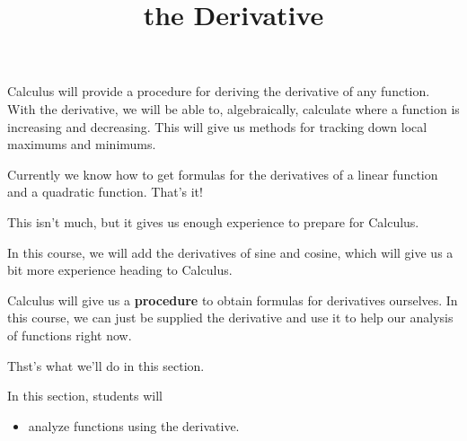 \documentclass{ximera}
\title{the Derivative}
\begin{document}
\begin{abstract}
%
\end{abstract}
\maketitle




Calculus will provide a procedure for deriving the derivative of any function.  With the derivative, we will be able to, algebraically, calculate where a function is increasing and decreasing.  This will give us methods for tracking down local maximums and minimums.


Currently we know how to get formulas for the derivatives of a linear function and a quadratic function.  That's it! 

This isn't much, but it gives us enough experience to prepare for Calculus.


In this course, we will add the derivatives of sine and cosine, which will give us a bit more experience heading to Calculus.


Calculus will give us a \textbf{\textcolor{blue!55!black}{procedure}} to obtain formulas for derivatives ourselves.  In this course, we can just be supplied the derivative and use it to help our analysis of functions right now.


Thst's what we'll do in this section.








\begin{sectionOutcomes}
In this section, students will 

\begin{itemize}
\item analyze functions using the derivative.
\end{itemize}
\end{sectionOutcomes}
\end{document}
